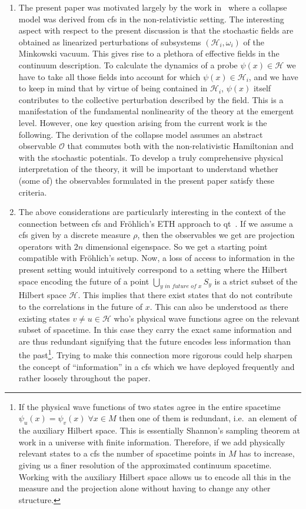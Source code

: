 \documentclass[reqno,11pt]{amsart}
\renewcommand{\H}{\mathcal{H}}
\numberwithin{equation}{section}
\begin{document}
\begin{enumerate}
    \item The present paper was motivated largely by the work in~\cite{finster2024causal} where a collapse model was derived from \ac{cfs} in the non-relativistic setting. The interesting aspect with respect to the present discussion is that the stochastic fields are obtained as linearized perturbations of subsystems $(\H_i,\omega_i)$ of the Minkowski vacuum. This gives rise to a plethora of effective fields in the continuum description. To calculate the dynamics of a probe $\psi (x)\in \H$ we have to take all those fields into account for which $\psi(x) \in \H_i$, and we have to keep in mind that by virtue of being contained in $\H_i$, $\psi(x)$ itself contributes to the collective perturbation described by the field. This is a manifestation of the fundamental nonlinearity of the theory at the emergent level. However, one key question arising from the current work is the following. The derivation of the collapse model assumes an abstract observable $\mathcal{O}$ that commutes both with the non-relativistic Hamiltonian and with the stochastic potentials. To develop a truly comprehensive physical interpretation of the theory, it will be important to understand whether (some of) the observables formulated in the present paper satisfy these criteria. 

\item The above considerations are particularly interesting in the context of the connection between \ac{cfs} and Fröhlich's ETH approach to \ac{qt}~\cite{ethcfs,froehlich2019review,froehlich2019relativistic}. If we assume a \ac{cfs} given by a discrete measure $\rho$, then the observables we get are projection operators with $2n$ dimensional eigenspace. So we get a starting point compatible with Fröhlich's setup. Now, a loss of access to information in the present setting would intuitively correspond to a setting where the Hilbert space encoding the future of a point $\bigcup_{y \textit{ in future of } x} S_y$ is a strict subset of the Hilbert space $\H$. This implies that there exist states that do not contribute to the correlations in the future of $x$. This can also be understood as there existing states $v\neq u \in \H$ who's physical wave functions agree on the relevant subset of spacetime. In this case they carry the exact same information and are thus redundant signifying that the future encodes less information than the past\footnote{If the physical wave functions of two states agree in the entire spacetime $\psi_u(x)=\psi_v(x) \; \forall x\in M$ then one of them is redundant, i.e.~an element of the auxiliary Hilbert space. This is essentially Shannon's sampling theorem at work in a universe with finite information. Therefore, if we add physically relevant states to a \ac{cfs} the number of spacetime points in $M$ has to increase, giving us a finer resolution of the approximated continuum spacetime. Working with the auxiliary Hilbert space allows us to encode all this in the measure and the projection alone without having to change any other structure. }. Trying to make this connection more rigorous could help sharpen the concept of ``information'' in a \ac{cfs} which we have deployed frequently and rather loosely throughout the paper.


\end{enumerate}
\end{document}
